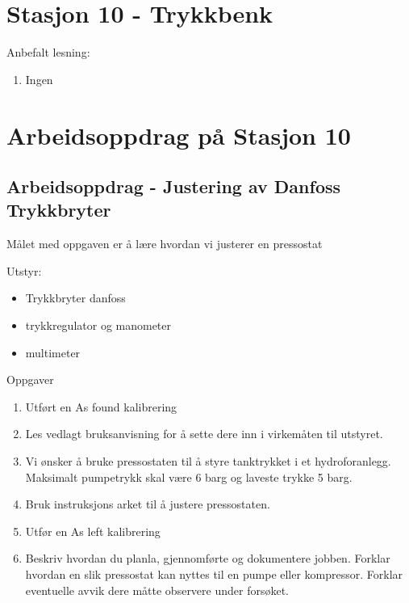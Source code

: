 
\noindent
\section*{Stasjon 10 - Trykkbenk}

\vskip 5pt
Anbefalt lesning:

\begin{enumerate}
	\item Ingen
\end{enumerate}




\section{Arbeidsoppdrag på Stasjon 10}

\subsection{Arbeidsoppdrag - Justering av Danfoss Trykkbryter}

Målet med oppgaven er å lære hvordan vi justerer en pressostat

Utstyr:
\begin{itemize}[noitemsep]
	\item Trykkbryter danfoss
	\item trykkregulator og manometer
	\item multimeter
\end{itemize}


Oppgaver \begin{enumerate}
	\item Utført en As found kalibrering 
	\item Les vedlagt bruksanvisning for å sette dere inn i virkemåten til utstyret.
	\item Vi ønsker å bruke pressostaten til å styre tanktrykket i et hydroforanlegg. Maksimalt pumpetrykk skal være 6 barg og laveste trykke 5 barg. 
	\item Bruk instruksjons arket til å justere pressostaten.
	\item Utfør en As left kalibrering 
	\item Beskriv hvordan du planla, gjennomførte og dokumentere jobben. Forklar hvordan en slik pressostat kan nyttes til en pumpe eller kompressor. Forklar eventuelle avvik dere måtte observere under forsøket. 
\end{enumerate}

